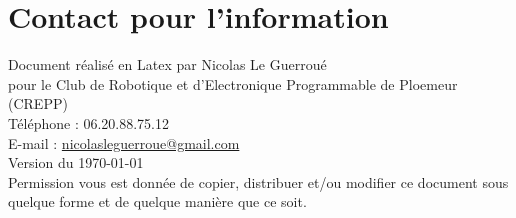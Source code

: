 
\section*{Contact pour l'information}

Document réalisé en Latex par Nicolas Le Guerroué \\
pour le Club de Robotique et d'Electronique Programmable de Ploemeur (CREPP) \\
Téléphone : 06.20.88.75.12 \\
E-mail : \href{mailto:nicolasleguerroue@gmail.com}{nicolasleguerroue@gmail.com} \\
Version du \today \\

Permission vous est donnée de copier, distribuer et/ou modifier ce document sous quelque forme et de quelque manière que ce soit.



